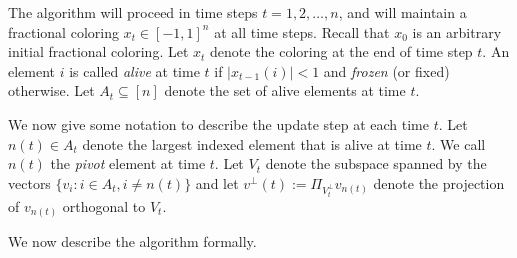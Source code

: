 \documentclass[11pt]{article}
\numberwithin{equation}{section}
\theoremstyle{definition}
\theoremstyle{plain}
\begin{document}
The algorithm will proceed in time steps $t=1,2,\ldots,n$, and will maintain a fractional coloring $x_t\in[-1,1]^n$ at all time steps. Recall that $x_0$ is an arbitrary initial fractional coloring.
Let $x_t$ denote the coloring at the end of time step $t$. An element $i$ is called \textit{alive} at time $t$ if $|x_{t-1}(i)|<1$ and \textit{frozen} (or fixed) otherwise. Let $A_t \subseteq [n]$  denote the set of alive elements at time $t$.

We now give some notation to describe the update step at each time $t$.  Let
$n(t) \in A_t$ denote the largest indexed element that is alive at time $t$. We call
$n(t)$ the \textit{pivot} element at time $t$.  Let $V_{t}$ denote the subspace
spanned by the vectors $\{v_i: i\in A_t, i\neq n(t)\}$ and let
$v^{\perp}(t) := \Pi_{V_t^\perp} v_{n(t)}$ denote the projection of $v_{n(t)}$
orthogonal to $V_{t}$.  

We now describe the algorithm formally.
\end{document}

